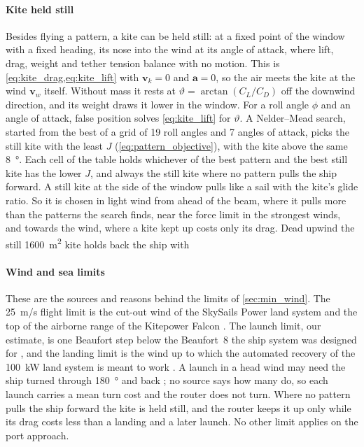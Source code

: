 \paragraph{Kite held still} Besides flying a pattern, a kite can be held still: at a fixed point of the window with a fixed heading, its nose into the wind at its angle of attack, where lift, drag, weight and tether tension balance with no motion. This is \cref{eq:kite_drag,eq:kite_lift} with $\mathbf v_k = 0$ and $\mathbf a = 0$, so the air meets the kite at the wind $\mathbf v_w$ itself. Without mass it rests at $\vartheta = \arctan(C_L/C_D)$ off the downwind direction, and its weight draws it lower in the window. For a roll angle $\phi$ and an angle of attack, false position solves \cref{eq:kite_lift} for $\vartheta$. A Nelder--Mead search, started from the best of a grid of 19 roll angles and 7 angles of attack, picks the still kite with the least $J$ (\cref{eq:pattern_objective}), with the kite above the same \SI{8}{\degree}. Each cell of the table holds whichever of the best pattern and the best still kite has the lower $J$, and always the still kite where no pattern pulls the ship forward. A still kite at the side of the window pulls like a sail with the kite's glide ratio. So it is chosen in light wind from ahead of the beam, where it pulls more than the patterns the search finds, near the force limit in the strongest winds, and towards the wind, where a kite kept up costs only its drag. Dead upwind the still \SI{1600}{m^2} kite holds back the ship with 

\paragraph{Wind and sea limits} These are the sources and reasons behind the limits of \cref{sec:min_wind}. The \SI{25}{m/s} flight limit is the cut-out wind of the SkySails Power land system \citep{skypower100_tib} and the top of the airborne range of the Kitepower Falcon \citep{kitepower2024}. The launch limit, our estimate, is one Beaufort step below the Beaufort~8 the ship system was designed for \citep{noaa2009}, and the landing limit is the wind up to which the automated recovery of the \SI{100}{kW} land system is meant to work \citep{skypower100_tib}. A launch in a head wind may need the ship turned through \SI{180}{\degree} and back \citep{wiwo2008}; no source says how many do, so each launch carries a mean turn cost and the router does not turn. Where no pattern pulls the ship forward the kite is held still, and the router keeps it up only while its drag costs less than a landing and a later launch. No other limit applies on the port approach.


